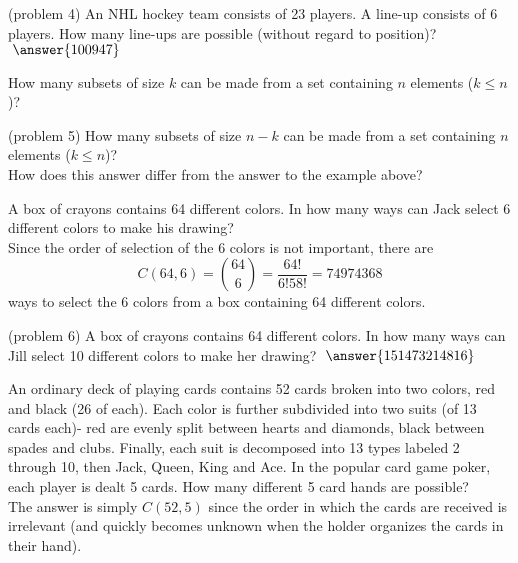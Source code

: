 \documentclass[handout]{ximera}
\begin{document}
\begin{problem}(problem 4)
An NHL hockey team consists of 23 players.  A line-up consists of 6 players.  
How many line-ups are possible (without regard to position)? $\; \answer{100947}$\\

\end{problem}


\begin{example}[example 5]
How many subsets of size $k$ can be made from a set containing $n$ elements ($k\leq n$)?\\
\end{example}


\begin{problem}(problem 5)
How many subsets of size $n-k$ can be made from a set containing $n$ elements ($k\leq n$)?\\
How does this answer differ from the answer to the example above?\\
\end{problem}


\begin{example}[example 6]
A box of crayons contains 64 different colors.  In how many ways can Jack select
 6 different colors to make his drawing?\\
 Since the order of selection of the 6 colors is not important, there are 
 \[
 C(64, 6) = \binom{64}{6} = \frac{64!}{6!58!}=74974368
 \]
 ways to select the 6 colors from a box containing 64 different colors.
 
\end{example}


\begin{problem}(problem 6)
A box of crayons contains 64 different colors.  In how many ways can Jill select
 10 different colors to make her drawing? $\; \answer{151473214816}$\\
\end{problem}



\begin{example}[example 7] 
An ordinary deck of playing cards contains 52 cards broken into two colors, red and black (26 of each).  
Each color is further subdivided into two suits (of 13 cards each)- red are evenly split between 
hearts and diamonds, black between spades and clubs. 
Finally, each suit is decomposed into 13 types labeled 2 through 10, then Jack, Queen, King and Ace.
In the popular card game poker, each player is dealt 5 cards.  How many different 5 card hands are possible?\\
The answer is simply $C(52, 5)$ since the order in which the cards are received is 
irrelevant (and quickly becomes unknown when the holder organizes the cards in their hand).
\end{example}
\end{document}
